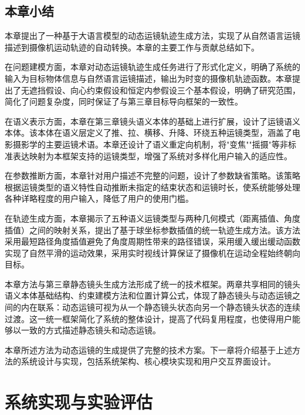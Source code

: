 \section{本章小结}

本章提出了一种基于大语言模型的动态运镜轨迹生成方法，实现了从自然语言运镜描述到摄像机运动轨迹的自动转换。本章的主要工作与贡献总结如下。

在问题建模方面，本章对动态运镜轨迹生成任务进行了形式化定义，明确了系统的输入为目标物体信息与自然语言运镜描述，输出为时变的摄像机轨迹函数。本章提出了无遮挡假设、向心约束假设和恒定内参假设三个基本假设，明确了研究范围，简化了问题复杂度，同时保证了与第三章目标导向框架的一致性。

在语义表示方面，本章在第三章镜头语义本体的基础上进行扩展，设计了运镜语义本体。该本体在语义层定义了推、拉、横移、升降、环绕五种运镜类型，涵盖了电影摄影学的主要运镜术语。本章还设计了语义重定向机制，将"变焦""摇摄"等非标准表达映射为本框架支持的运镜类型，增强了系统对多样化用户输入的适应性。

在参数推断方面，本章针对用户描述不完整的问题，设计了参数缺省策略。该策略根据运镜类型的语义特性自动推断未指定的结束状态和运镜时长，使系统能够处理各种详略程度的用户输入，降低了用户的使用门槛。

在轨迹生成方面，本章揭示了五种语义运镜类型与两种几何模式（距离插值、角度插值）之间的映射关系，提出了基于球坐标参数插值的统一轨迹生成方法。该方法采用最短路径角度插值避免了角度周期性带来的路径错误，采用缓入缓出缓动函数实现了自然平滑的运动效果，采用实时视线计算保证了摄像机在运动全程始终朝向目标。

本章方法与第三章静态镜头生成方法形成了统一的技术框架。两章共享相同的镜头语义本体基础结构、约束建模方法和位置计算公式，体现了静态镜头与动态运镜之间的内在联系：动态运镜可视为从一个静态镜头状态向另一个静态镜头状态的连续过渡。这一统一框架简化了系统的整体设计，提高了代码复用程度，也使得用户能够以一致的方式描述静态镜头和动态运镜。

本章所述方法为动态运镜的生成提供了完整的技术方案。下一章将介绍基于上述方法的系统设计与实现，包括系统架构、核心模块实现和用户交互界面设计。



\chapter{系统实现与实验评估}
\label{chap:implementation}

